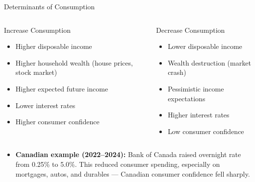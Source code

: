 \documentclass[aspectratio=169]{beamer}
\begin{document}

\begin{frame}{Determinants of Consumption}
\transfade
\begin{columns}
\begin{block}{\textcolor{accent}{Increase Consumption}}
\begin{itemize}
  \item Higher disposable income
  \item Higher household wealth (house prices, stock market)
  \item Higher expected future income
  \item Lower interest rates
  \item Higher consumer confidence
\end{itemize}
\end{block}
\begin{block}{\textcolor{canadared}{Decrease Consumption}}
\begin{itemize}
  \item Lower disposable income
  \item Wealth destruction (market crash)
  \item Pessimistic income expectations
  \item Higher interest rates
  \item Low consumer confidence
\end{itemize}
\end{block}
\end{columns}
\vspace{0.5em}
\begin{itemize}
  \item \textbf{Canadian example (2022--2024):} Bank of Canada raised overnight rate from 0.25\% to 5.0\%. This reduced consumer spending, especially on mortgages, autos, and durables --- Canadian consumer confidence fell sharply.
\end{itemize}
\end{frame}
\end{document}
